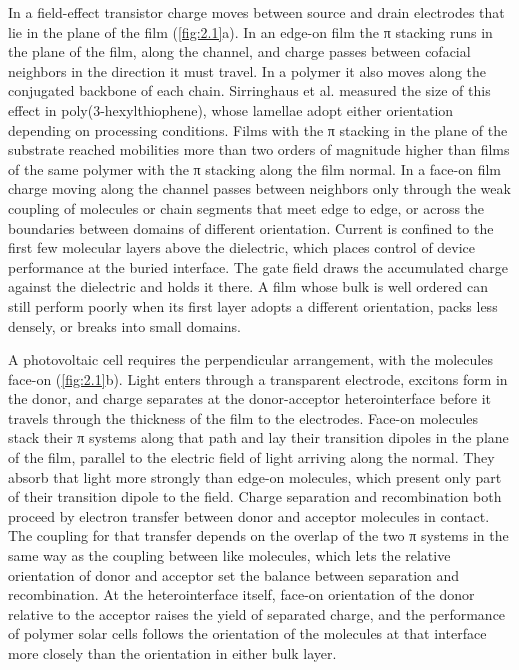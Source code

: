 In a field-effect transistor charge moves between source and drain electrodes that lie in the plane of the film (\cref{fig:2.1}a). In an edge-on film the π stacking runs in the plane of the film, along the channel, and charge passes between cofacial neighbors in the direction it must travel. In a polymer it also moves along the conjugated backbone of each chain. Sirringhaus et al. measured the size of this effect in poly(3-hexylthiophene), whose lamellae adopt either orientation depending on processing conditions. Films with the π stacking in the plane of the substrate reached mobilities more than two orders of magnitude higher than films of the same polymer with the π stacking along the film normal.\autocite{sirringhausTwodimensionalChargeTransport1999} In a face-on film charge moving along the channel passes between neighbors only through the weak coupling of molecules or chain segments that meet edge to edge, or across the boundaries between domains of different orientation. Current is confined to the first few molecular layers above the dielectric\autocite{dodabalapurOrganicTransistorsTwoDimensional1995}, which places control of device performance at the buried interface.\autocite{dindaultCorrelatingMorphologyMolecular2022} The gate field draws the accumulated charge against the dielectric and holds it there. A film whose bulk is well ordered can still perform poorly when its first layer adopts a different orientation, packs less densely, or breaks into small domains.

A photovoltaic cell requires the perpendicular arrangement, with the molecules face-on (\cref{fig:2.1}b). Light enters through a transparent electrode, excitons form in the donor, and charge separates at the donor-acceptor heterointerface before it travels through the thickness of the film to the electrodes. Face-on molecules stack their π systems along that path and lay their transition dipoles in the plane of the film, parallel to the electric field of light arriving along the normal. They absorb that light more strongly than edge-on molecules, which present only part of their transition dipole to the field. Charge separation and recombination both proceed by electron transfer between donor and acceptor molecules in contact. The coupling for that transfer depends on the overlap of the two π systems in the same way as the coupling between like molecules, which lets the relative orientation of donor and acceptor set the balance between separation and recombination. At the heterointerface itself, face-on orientation of the donor relative to the acceptor raises the yield of separated charge, and the performance of polymer solar cells follows the orientation of the molecules at that interface more closely than the orientation in either bulk layer.\autocite{tumblestonInfluenceMolecularOrientation2014}


